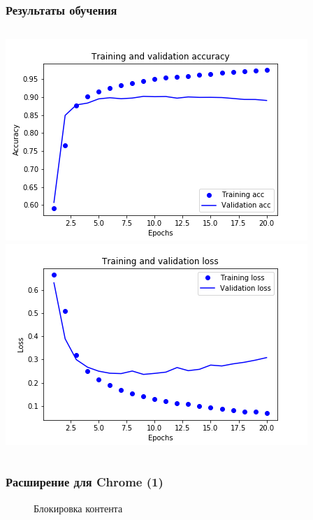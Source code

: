 \documentclass[xetex,mathserif,serif]{beamer}
\begin{document}
	\begin{frame}
		\frametitle{Результаты обучения}
	    	\begin{columns}[t]
                    \includegraphics[scale=0.35]{images/acc.png}
                    \includegraphics[scale=0.35]{images/loss.png}
            \end{columns}
	\end{frame}		
	
	\begin{frame}
		\frametitle{Расширение для Chrome (1)}
		\begin{figure}[h]
            \caption{Блокировка контента}
            \label{fig:image}
        \end{figure}
	\end{frame}	
	
\end{document}
